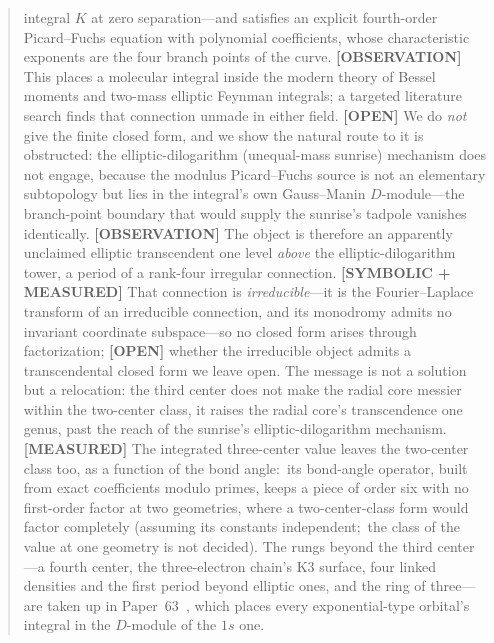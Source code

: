 \documentclass[aps,pra,twocolumn,superscriptaddress,longbibliography]{revtex4-2}
\begin{document}
\begin{abstract}
integral $K$ at zero separation---and satisfies an explicit fourth-order
Picard--Fuchs equation with polynomial coefficients, whose characteristic exponents are the four branch points
of the curve.  \textbf{[OBSERVATION]} This places a molecular integral inside
the modern theory of Bessel moments and two-mass elliptic Feynman integrals;
a targeted literature search finds that connection unmade in either field.
\textbf{[OPEN]} We do \emph{not} give the finite closed form, and we show the
natural route to it is obstructed: the elliptic-dilogarithm (unequal-mass
sunrise) mechanism does not engage, because the modulus Picard--Fuchs source
is not an elementary subtopology but lies in the integral's own Gauss--Manin
$D$-module---the branch-point boundary that would supply the sunrise's tadpole
vanishes identically.  \textbf{[OBSERVATION]} The object is therefore an
apparently unclaimed elliptic transcendent one level \emph{above} the
elliptic-dilogarithm tower, a period of a rank-four irregular connection.
\textbf{[SYMBOLIC + MEASURED]} That connection is \emph{irreducible}---it is the
Fourier--Laplace transform of an irreducible connection, and its monodromy admits
no invariant coordinate subspace---so no closed form arises through factorization;
\textbf{[OPEN]} whether the irreducible object admits a transcendental closed form
we leave open.  The message is not a solution
but a relocation: the third center does not make the radial core messier
within the two-center class, it raises the radial core's transcendence one genus, past the
reach of the sunrise's elliptic-dilogarithm mechanism.  \textbf{[MEASURED]} The integrated
three-center value leaves the two-center class too, as a function of the bond angle:\ its
bond-angle operator, built from exact coefficients modulo primes, keeps a piece of order six
with no first-order factor at two geometries, where a two-center-class form would factor
completely (assuming its constants independent;\ the class of the value at one geometry is
not decided).
The rungs beyond the third center---a fourth center, the three-electron
chain's K3 surface, four linked densities and the first period beyond
elliptic ones, and the ring of three---are taken up in
Paper~63~\cite{loutey_paper63}, which places every exponential-type
orbital's integral in the $D$-module of the $1s$ one.
\end{abstract}

\maketitle
\end{document}
